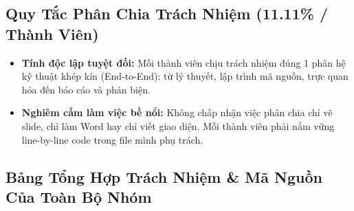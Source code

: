 \documentclass[12pt,a4paper]{article}
\begin{document}
\subsection{Quy Tắc Phân Chia Trách Nhiệm (11.11\% / Thành Viên)}
\begin{itemize}
    \item \textbf{Tính độc lập tuyệt đối:} Mỗi thành viên chịu trách nhiệm đúng 1 phân hệ kỹ thuật khép kín (End-to-End): từ lý thuyết, lập trình mã nguồn, trực quan hóa đến báo cáo và phản biện.
    \item \textbf{Nghiêm cấm làm việc bề nổi:} Không chấp nhận việc phân chia chỉ vẽ slide, chỉ làm Word hay chỉ viết giao diện. Mỗi thành viên phải nắm vững line-by-line code trong file mình phụ trách.
\end{itemize}

\subsection{Bảng Tổng Hợp Trách Nhiệm & Mã Nguồn Của Toàn Bộ Nhóm}
\end{document}
